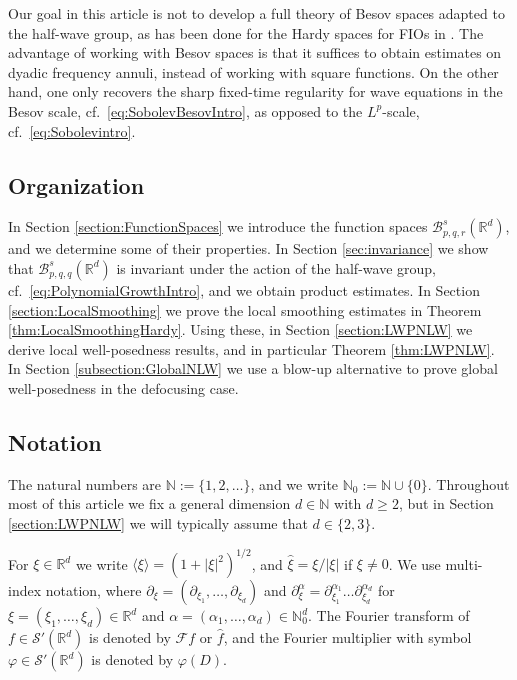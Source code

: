 \documentclass{amsart}
\theoremstyle{definition}
\newcommand{\N}{\mathbb{N}}
\newcommand {\Rd}{\mathbb{R}^{d}}
\newcommand {\ph}{\varphi}
\newcommand {\Baspqr}{\mathcal{B}^{s}_{p,q,r}(\Rd)}
\newcommand {\Baspqq}{\mathcal{B}^{s}_{p,q,q}(\Rd)}
\newcommand {\rb}{\rangle}
\newcommand {\lb}{{\langle}}
\newcommand {\Sw}{\mathcal{S}}
\newcommand {\F}{{\mathcal{F}}}
\numberwithin{equation}{section}
\begin{document}
Our goal in this article is not to develop a full theory of Besov spaces adapted to the half-wave group, as has been done for the Hardy spaces for FIOs in \cite{HassellPortalRozendaal2020,Rozendaal2021,FaLiRoSo19}. The advantage of working with Besov spaces is that it suffices to obtain estimates on dyadic frequency annuli, instead of working with square functions. On the other hand, one only recovers the sharp fixed-time regularity for wave equations in the Besov scale, cf.~\eqref{eq:SobolevBesovIntro}, as opposed to the $L^{p}$-scale, cf.~\eqref{eq:Sobolevintro}.


\subsection*{Organization} In Section \ref{section:FunctionSpaces} we introduce the function spaces $\Baspqr$, and we determine some of their properties. In Section \ref{sec:invariance} we show that $\Baspqq$ is invariant under the action of the half-wave group, cf.~\eqref{eq:PolynomialGrowthIntro}, and we obtain product estimates. In Section \ref{section:LocalSmoothing} we prove the local smoothing estimates in Theorem \ref{thm:LocalSmoothingHardy}. Using these, in Section \ref{section:LWPNLW} we derive local well-posedness results, and in particular Theorem \ref{thm:LWPNLW}. In Section \ref{subsection:GlobalNLW} we use a blow-up alternative to prove global well-posedness in the defocusing case.

\subsection*{Notation}

The natural numbers are $\N:=\{1,2,\ldots\}$, and we write $\N_{0}:=\N\cup\{0\}$. Throughout most of this article we fix a general dimension $d\in\N$ with $d\geq2$, but in Section \ref{section:LWPNLW} we will typically assume that $d\in \{2,3\}$.

For $\xi\in\Rd$ we write $\lb\xi\rb=(1+|\xi|^{2})^{1/2}$, and $\hat{\xi}=\xi/|\xi|$ if $\xi\neq0$. We use multi-index notation, where $\partial_{\xi}=(\partial_{\xi_{1}},\ldots,\partial_{\xi_{d}})$ and $\partial^{\alpha}_{\xi}=\partial^{\alpha_{1}}_{\xi_{1}}\ldots\partial^{\alpha_{d}}_{\xi_{d}}$  
for $\xi=(\xi_{1},\ldots,\xi_{d})\in\Rd$ and $\alpha=(\alpha_{1},\ldots,\alpha_{d})\in\N_{0}^{d}$. The Fourier transform of $f\in\Sw'(\Rd)$ is denoted by $\F f$ or $\widehat{f}$, and the Fourier multiplier with symbol $\ph\in\Sw'(\Rd)$ is denoted by $\ph(D)$. 
\end{document}

